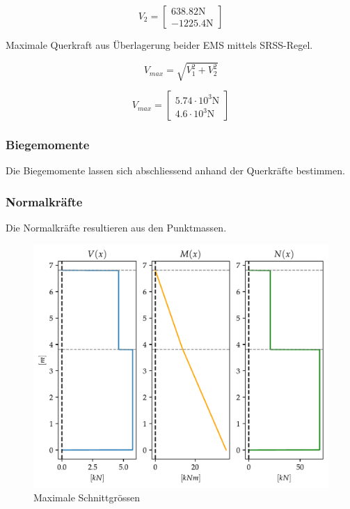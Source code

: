 \documentclass[
  letterpaper,
  DIV=11]{scrreprt}
\begin{document}
\begin{equation}V_{2} = \left[\begin{matrix}638.82 \text{N}\\- 1225.4 \text{N}\end{matrix}\right]\end{equation}

Maximale Querkraft aus Überlagerung beider EMS mittels SRSS-Regel.

\[
V_{max} = \sqrt{V_1^2 + V_2^2}
\]

\begin{equation}V_{max} = \left[\begin{matrix}5.74 \cdot 10^{3} \text{N}\\4.6 \cdot 10^{3} \text{N}\end{matrix}\right]\end{equation}

\hypertarget{biegemomente-1}{%
\subsubsection{Biegemomente}\label{biegemomente-1}}

Die Biegemomente lassen sich abschliessend anhand der Querkräfte
bestimmen.

\hypertarget{normalkruxe4fte-1}{%
\subsubsection{Normalkräfte}\label{normalkruxe4fte-1}}

Die Normalkräfte resultieren aus den Punktmassen.

\begin{figure}[H]

{\centering \includegraphics{index_files/mediabag/mms_06_files/figure-pdf/fig-schnittgroessen-output-1.pdf}

}

\caption{\label{fig-schnittgroessen}Maximale Schnittgrössen}

\end{figure}
\end{document}
